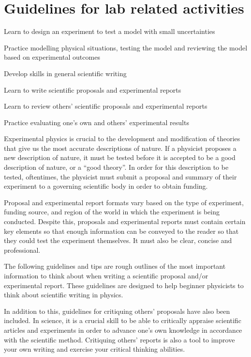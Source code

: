\chapter{Guidelines for lab related activities}
\label{chapter:labs}


\begin{learningObjectives}{
 \item Learn to design an experiment to test a model with small uncertainties
 \item Practice modelling physical situations, testing the model and reviewing the model based on experimental outcomes
 \item Develop skills in general scientific writing 
 \item Learn to write scientific proposals and experimental reports
 \item Learn to review others' scientific proposals and experimental reports
 \item Practice evaluating one's own and others' experimental results
 }
\end{learningObjectives}


Experimental physics is crucial to the development and modification of theories that give us the most accurate descriptions of nature. If a physicist proposes a new description of nature, it must be tested before it is accepted to be a good description of nature, or a ``good theory''. In order for this description to be tested, oftentimes, the physicist must submit a proposal and summary of their experiment to a governing scientific body in order to obtain funding. 

Proposal and experimental report formats vary based on the type of experiment, funding source, and region of the world in which the experiment is being conducted. Despite this, proposals and experimental reports must contain certain key elements so that enough information can be conveyed to the reader so that they could test the experiment themselves. It must also be clear, concise and professional. 

The following guidelines and tips are rough outlines of the most important information to think about when writing a scientific proposal and/or experimental report. These guidelines are designed to help beginner physicists to think about scientific writing in physics. 

In addition to this, guidelines for critiquing others' proposals have also been included. In science, it is a crucial skill to be able to critically appraise scientific articles and experiments in order to advance one's own knowledge in accordance with the scientific method. Critiquing others' reports is also a tool to improve your own writing and exercise your critical thinking abilities.  

